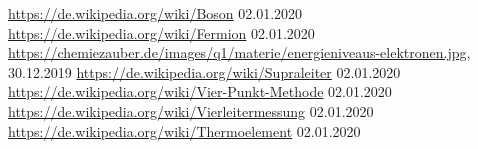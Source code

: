 \begin{thebibliography}{xxx}
		\url{https://de.wikipedia.org/wiki/Boson}
		02.01.2020
		\url{https://de.wikipedia.org/wiki/Fermion}
		02.01.2020
        \url{https://chemiezauber.de/images/q1/materie/energieniveaus-elektronen.jpg},
		30.12.2019
		\url{https://de.wikipedia.org/wiki/Supraleiter}
		02.01.2020
		\url{https://de.wikipedia.org/wiki/Vier-Punkt-Methode}
		02.01.2020
		\url{https://de.wikipedia.org/wiki/Vierleitermessung}
		02.01.2020
		\url{https://de.wikipedia.org/wiki/Thermoelement}
		02.01.2020
\end{thebibliography}
 
